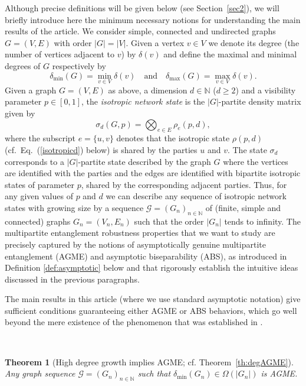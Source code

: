 \documentclass[a4paper,onecolumn,accepted=2024-12-14]{quantumarticle}
\theoremstyle{plain}
\newtheorem{result}{Theorem}
\newcommand{\cG}{{\mathcal G}}         %
\newcommand{\N}{\mathbb{N}} %
\newcommand{\quadtext}[1]{\quad\text{#1}\quad}
\begin{document}
Although precise definitions will be given below (see Section~\ref{sec2}), we will briefly introduce here the minimum necessary notions for understanding the main results of the article. We consider simple, connected and undirected graphs $G=(V,E)$ with order $|G|=|V|$. Given a vertex $v\in V$ we denote its degree (the number of vertices adjacent to $v$) by $\delta(v)$ and define the maximal and minimal degrees of $G$ respectively by
\begin{equation}%
\delta_{\mathrm{min}}(G)=\min_{v\in V}\delta(v)
\quadtext{and}
\delta_{\mathrm{max}}(G)=\max_{v\in V}\delta(v).
\end{equation}
Given a graph $G=(V,E)$ as above, a dimension $d\in\mathbb{N}$ ($d\geq2$) and a visibility parameter $p\in[0,1]$,  the \textit{isotropic network state} is the $|G|$-partite density matrix given by
\begin{equation}
\sigma_d(G,p)= \bigotimes_{e\in E}\rho_e(p,d),
\end{equation}where the subscript $e=\{u,v\}$ denotes that the isotropic state $\rho(p,d)$ (cf.\ Eq.\ (\ref{isotropicd}) below) is shared by the parties $u$ and $v$. The state $\sigma_d$ corresponds to a
$|G|$-partite state described by the graph $G$ where the vertices are identified with the parties and the edges are identified with bipartite isotropic states of parameter $p$, shared by the corresponding adjacent parties. Thus, for any given values of $p$ and $d$ we can describe any sequence of isotropic network states with growing size by a sequence $\cG=(G_n)_{n\in\N}$ of (finite, simple and connected) graphs $G_n=(V_n,E_n)$ such that the order
$|G_n|$ tends to infinity. The multipartite entanglement robustness properties that we want to study are precisely captured by the notions of asymptotically genuine multipartite entanglement (AGME) and asymptotic biseparability (ABS), as introduced in Definition \ref{def:asymptotic} below and that rigorously establish the intuitive ideas discussed in the previous paragraphs.

The main results in this article (where we use standard asymptotic notation) give sufficient conditions guaranteeing either AGME or ABS behaviors, which go well beyond the mere existence of the phenomenon that was established in \cite{ASGME}.

\

\begin{result}[High degree growth implies AGME;  cf. Theorem~\ref{th:degAGME}]
Any graph sequence $\cG=(G_n)_{n\in\N}$ such that $\delta_{\mathrm{min}}(G_n)\in\Omega(|G_n|)$ is AGME.\label{thm:1}
\end{result}
\
\end{document}

